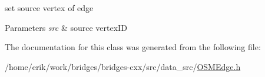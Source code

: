 set source vertex of edge


\begin{DoxyParams}{Parameters}
{\em src} & source vertex\+ID \\
\hline
\end{DoxyParams}


The documentation for this class was generated from the following file\+:\begin{DoxyCompactItemize}
\item 
/home/erik/work/bridges/bridges-\/cxx/src/data\+\_\+src/\hyperlink{_o_s_m_edge_8h}{O\+S\+M\+Edge.\+h}\end{DoxyCompactItemize}
